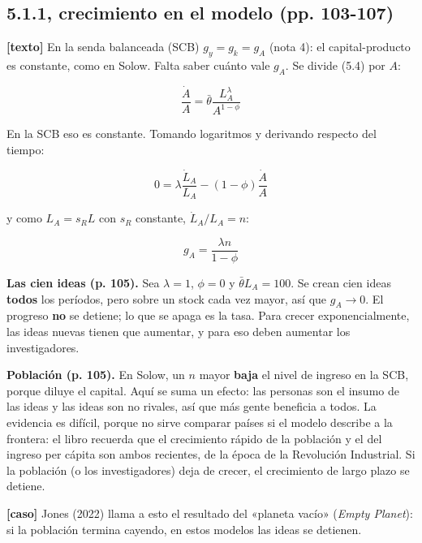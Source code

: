 \documentclass[11pt,a4paper]{article}
\begin{document}
\subsection*{5.1.1, crecimiento en el modelo (pp. 103-107)}

\textbf{[texto]} En la senda balanceada (SCB) $g_y = g_k = g_A$ (nota 4): el capital-producto es constante, como en Solow. Falta saber cuánto vale $g_A$. Se divide (5.4) por $A$:

\begin{equation*}\frac{\dot A}{A} = \bar\theta \frac{L_A^\lambda}{A^{1-\phi}} \tag{5.5}\end{equation*}

En la SCB eso es constante. Tomando logaritmos y derivando respecto del tiempo:

\begin{equation*}0 = \lambda\frac{\dot L_A}{L_A} - (1-\phi)\frac{\dot A}{A} \tag{5.6}\end{equation*}

y como $L_A = s_R L$ con $s_R$ constante, $\dot L_A / L_A = n$:

\begin{equation*}g_A = \frac{\lambda n}{1-\phi} \tag{5.7}\end{equation*}

\textbf{Las cien ideas (p. 105).} Sea $\lambda = 1$, $\phi = 0$ y $\bar\theta L_A = 100$. Se crean cien ideas \textbf{todos} los períodos, pero sobre un stock cada vez mayor, así que $g_A \to 0$. El progreso \textbf{no} se detiene; lo que se apaga es la tasa. Para crecer exponencialmente, las ideas nuevas tienen que aumentar, y para eso deben aumentar los investigadores.

\textbf{Población (p. 105).} En Solow, un $n$ mayor \textbf{baja} el nivel de ingreso en la SCB, porque diluye el capital. Aquí se suma un efecto: las personas son el insumo de las ideas y las ideas son no rivales, así que más gente beneficia a todos. La evidencia es difícil, porque no sirve comparar países si el modelo describe a la frontera: el libro recuerda que el crecimiento rápido de la población y el del ingreso per cápita son ambos recientes, de la época de la Revolución Industrial. Si la población (o los investigadores) deja de crecer, el crecimiento de largo plazo se detiene.

\textbf{[caso]} Jones (2022) llama a esto el resultado del «planeta vacío» (\emph{Empty Planet}): si la población termina cayendo, en estos modelos las ideas se detienen.
\end{document}
